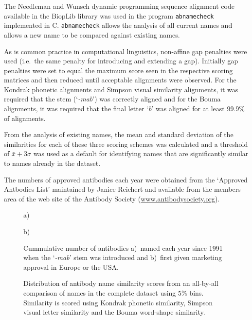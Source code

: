 \documentclass{article}
\newcommand{\eg}[1]{\mbox{`\emph{#1}'}}
\begin{document}
The Needleman and Wunsch dynamic programming sequence alignment code
available in the BiopLib\cite{porter:bioplib} library was used in the
program \verb|abnamecheck| implemented in C. \verb|abnamecheck| allows
the analysis of all current names and allows a new name to be compared
against existing names.

As is common practice in computational linguistics, non-affine gap
penalties were used (i.e.\ the same penalty for introducing and
extending a gap). Initially gap penalties were set to equal the
maximum score seen in the respective scoring matrices and then reduced
until acceptable alignments were observed. For the Kondrak phonetic
alignments and Simpson visual similarity alignments, it was required
that the stem (\eg{-mab}) was correctly aligned and for the Bouma
alignments, it was required that the final letter \eg{b} was aligned
for at least 99.9\% of alignments.

From the analysis of existing names, the mean and standard deviation
of the similarities for each of these three scoring schemes was
calculated and a threshold of $\bar{x} + 3\sigma$ was used as a
default for identifying names that are significantly similar to names
already in the dataset.

The numbers of approved antibodies each year were obtained from the
`Approved Antbodies List' maintained by Janice Reichert and available
from the members area of the web site of the Antibody Society
(\url{www.antibodysociety.org}).


\begin{figure}
  \noindent a)
  \begin{center}
  \end{center}
  \noindent b)
  \begin{center}
  \end{center}
  \caption{\label{fig:namesandapproved}Cummulative number of antibodies
  a)~named each year since 1991 when the \eg{-mab} stem was introduced and
  b)~first given marketing approval in Europe or the USA.}
\end{figure}



\begin{figure}
\begin{center}
\end{center}
\caption{\label{fig:distrib} Distribution of antibody name similarity
  scores from an all-by-all comparison of names in the complete
  dataset using 5\% bins. Similarity is scored using Kondrak phonetic
  similarity, Simpson visual letter similarity and the Bouma
  word-shape similarity.}
\end{figure}
\end{document}

